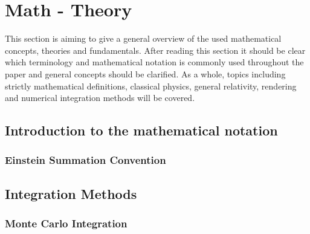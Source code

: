 \section{Math - Theory}\label{sec:math---theory}

This section is aiming to give a general overview of the used mathematical concepts, theories and fundamentals.
After reading this section it should be clear which terminology and mathematical notation is commonly used throughout
the paper and general concepts should be clarified.
As a whole, topics including strictly mathematical definitions, classical physics, general relativity, rendering
and numerical integration methods will be covered.

\subsection{Introduction to the mathematical notation}

\subsubsection{Einstein Summation Convention}






\subsection{Integration Methods}\label{subsec:integration-methods}

\subsubsection{Monte Carlo Integration}\label{subsubsec:monte-carlo}









